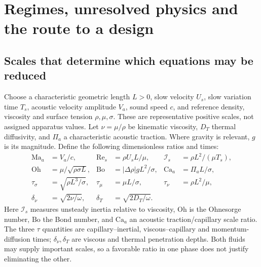 \section{Regimes, unresolved physics and the route to a design}\label{sec:validity}

\subsection{Scales that determine which equations may be reduced}
Choose a characteristic geometric length $L>0$, slow velocity $U_s$, slow
variation time $T_s$, acoustic velocity amplitude $V_a$, sound speed $c$, and
reference density, viscosity and surface tension $\rho,\mu,\sigma$. These are
representative positive scales, not assigned apparatus values. Let
$\nu=\mu/\rho$ be kinematic viscosity, $D_T$ thermal diffusivity, and
$\Pi_a$ a characteristic acoustic traction. Where gravity is relevant, $g$ is
its magnitude. Define the following dimensionless ratios and times:
\begin{align}
 \mathrm{Ma}_a&=V_a/c, &
 \mathrm{Re}_s&=\rho U_sL/\mu, &
 \mathcal I_s&=\rho L^2/(\mu T_s),\label{eq:scale-ratios-a}\\
 \mathrm{Oh}&=\mu/\sqrt{\rho\sigma L}, &
 \mathrm{Bo}&=|\Delta\rho|gL^2/\sigma, &
 \mathrm{Ca}_a&=\Pi_aL/\sigma,\label{eq:scale-ratios-b}\\
 \tau_\sigma&=\sqrt{\rho L^3/\sigma}, &
 \tau_\mu&=\mu L/\sigma, &
 \tau_\nu&=\rho L^2/\mu,\label{eq:scale-times}\\
 \delta_\nu&=\sqrt{2\nu/\omega}, &
 \delta_T&=\sqrt{2D_T/\omega}.&&\label{eq:boundary-layer-scales}
\end{align}
Here $\mathcal I_s$ measures unsteady inertia relative to viscosity,
$\mathrm{Oh}$ is the Ohnesorge number, $\mathrm{Bo}$ the Bond number, and
$\mathrm{Ca}_a$ an acoustic traction/capillary scale ratio. The three $\tau$
quantities are capillary--inertial, viscous--capillary and momentum-diffusion
times; $\delta_\nu,\delta_T$ are viscous and thermal penetration depths.
Both fluids may supply important scales, so a favorable ratio in one phase
does not justify eliminating the other.

